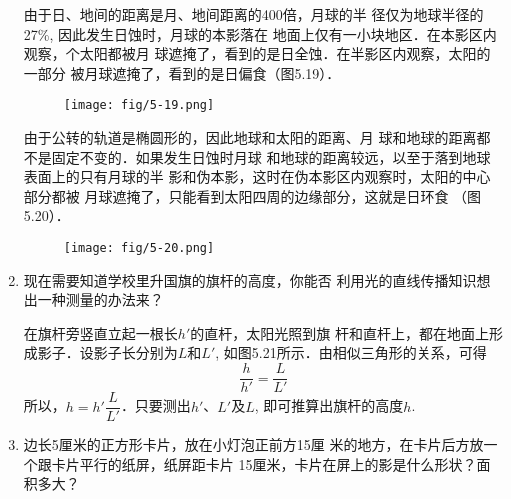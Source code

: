 \begin{enumerate}
\begin{solution}
由于日、地间的距离是月、地间距离的400倍，月球的半
径仅为地球半径的27\%, 因此发生日蚀时，月球的本影落在
地面上仅有一小块地区．在本影区内观察，个太阳都被月
球遮掩了，看到的是日全蚀．在半影区内观察，太阳的一部分
被月球遮掩了，看到的是日偏食（图5.19）． 
    \begin{figure}[htp]
        \centering
        \texttt{[image: fig/5-19.png]}
        \caption{}
    \end{figure}    

由于公转的轨道是椭圆形的，因此地球和太阳的距离、月
球和地球的距离都不是固定不变的．如果发生日蚀时月球
和地球的距离较远，以至于落到地球表面上的只有月球的半
影和伪本影，这时在伪本影区内观察时，太阳的中心部分都被
月球遮掩了，只能看到太阳四周的边缘部分，这就是日环食
（图5.20）．    
\begin{figure}[htp]
    \centering
    \texttt{[image: fig/5-20.png]}
    \caption{}
\end{figure}  
\end{solution}

\item 现在需要知道学校里升国旗的旗杆的高度，你能否
利用光的直线传播知识想出一种测量的办法来？

\begin{solution}
    在旗杆旁竖直立起一根长$h'$的直杆，太阳光照到旗
    杆和直杆上，都在地面上形成影子．设影子长分别为$L$和$L'$, 
    如图5.21所示．由相似三角形的关系，可得
    \[\frac{h}{h'}=\frac{L}{L'}\]
    所以，$h=h'\dfrac{L}{L'}$．只要测出$h'$、$L'$及$L$, 即可推算出旗杆的高度$h$.
\begin{figure}[htp]
    \centering
{}
    \caption{}
\end{figure}
\end{solution}

\item 边长5厘米的正方形卡片，放在小灯泡正前方15厘
米的地方，在卡片后方放一个跟卡片平行的纸屏，纸屏距卡片
15厘米，卡片在屏上的影是什么形状？面积多大？


\end{enumerate}
